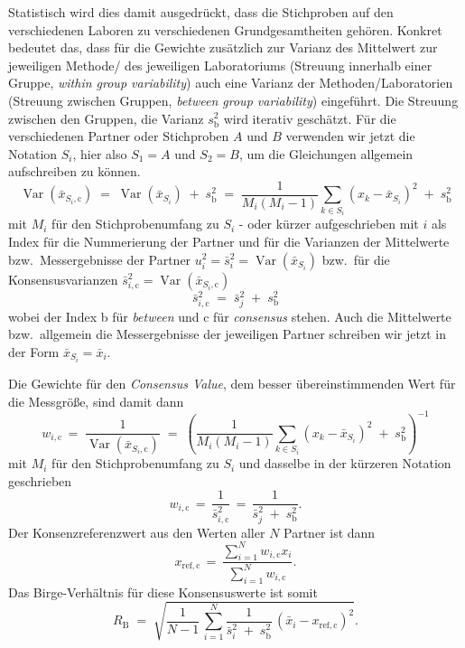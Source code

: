 Statistisch wird dies damit ausgedrückt, dass die Stichproben auf den verschiedenen
Laboren zu verschiedenen Grundgesamtheiten gehören.
Konkret bedeutet das, dass für die Gewichte zusätzlich zur Varianz des Mittelwert
zur jeweiligen Methode/ des jeweiligen Laboratoriums
(Streuung innerhalb einer Gruppe, \textsl{within group variability})
auch eine Varianz der Methoden/Laboratorien (Streuung zwischen Gruppen,
\textsl{between group variability}) eingeführt.
Die Streuung zwischen den Gruppen, die Varianz $s^2_\mathrm{b}$ wird
iterativ geschätzt. Für die verschiedenen Partner oder Stichproben $A$ und $B$
verwenden wir jetzt die Notation $S_i$, hier also $S_1 = A$ und $S_2 = B$, um
die Gleichungen allgemein aufschreiben zu können.
\begin{equation*}
\operatorname{Var}(\bar x_{S_i,\mathrm{c}}) \; = \;
\operatorname{Var}(\bar x_{S_i}) \; + \; s^2_\mathrm{b} \; = \;
\frac{1}{M_i (M_i - 1)} \sum\limits_{k \in S_i}
\left( x_{k} - \bar x_{S_i} \right)^2 
\; + \; s^2_\mathrm{b}
\end{equation*}
mit $M_i$ für den Stichprobenumfang zu $S_i$ -
oder kürzer aufgeschrieben mit $i$ als Index für die Nummerierung der Partner
und für die Varianzen der Mittelwerte bzw.\ Messergebnisse 
der Partner
$u^2_i = \bar s^2_i = \operatorname{Var}(\bar x_{S_i})$
bzw.\ für die Konsensusvarianzen
$\bar s^2_{i,\mathrm{c}} = \operatorname{Var}(\bar x_{S_i,\mathrm{c}})$
\begin{equation}
\bar s^2_{i,\mathrm{c}} \; = \; \bar s^2_j \; + \; s^2_\mathrm{b}
\label{eq:consensusVariability}
\end{equation}
wobei der Index b für \textsl{between} und c für \textsl{consensus}
stehen. Auch die Mittelwerte bzw.\ allgemein die Messergebnisse der
jeweiligen Partner schreiben wir jetzt in der Form $\bar x_{S_i} = \bar x_i$.

Die Gewichte für den \textsl{Consensus Value}, dem besser übereinstimmenden
Wert für die Messgröße, sind damit dann
\begin{equation*}
w_{i,\mathrm{c}} \, = \; \frac{1}{\operatorname{Var}(\bar x_{S_i,\mathrm{c}})} \; = \;
\left(\frac{1}{M_i (M_i - 1)} \sum\limits_{k \in S_i}
\left( x_{k} - \bar x_{S_i} \right)^2 
\; + \; s^2_\mathrm{b} \right)^{-1}
\end{equation*}
mit $M_i$ für den Stichprobenumfang zu $S_i$ 
und dasselbe in der kürzeren Notation geschrieben
\begin{equation}
w_{i,\mathrm{c}} \, = \, \frac{1}{\bar s^2_{i,\mathrm{c}}} \, = \, \frac{1}{\bar s^2_j \; + \; s^2_\mathrm{b}} .
\label{eq:consensusWeights}
\end{equation}
Der Konsenzreferenzwert aus den Werten aller $N$ Partner ist dann
\begin{equation}
x_\mathrm{ref, c} \, = \, 
\frac{\sum\limits_{i=1}^N w_{i,\mathrm{c}} x_i}{\sum\limits_{i=1}^N w_{i,\mathrm{c}} }.
\label{eq:consensusMean}
\end{equation}
Das Birge-Verhältnis für diese Konsensuswerte ist somit
\begin{equation}
R_\mathrm{B} \; = \; \sqrt{ \frac{1}{N-1} \, \sum\limits_{i=1}^N
\frac{1}{\bar s^2_i \; + \; s^2_\mathrm{b}} \, \left(\bar x_i - x_\mathrm{ref, c}\right)^2}.
\end{equation}

